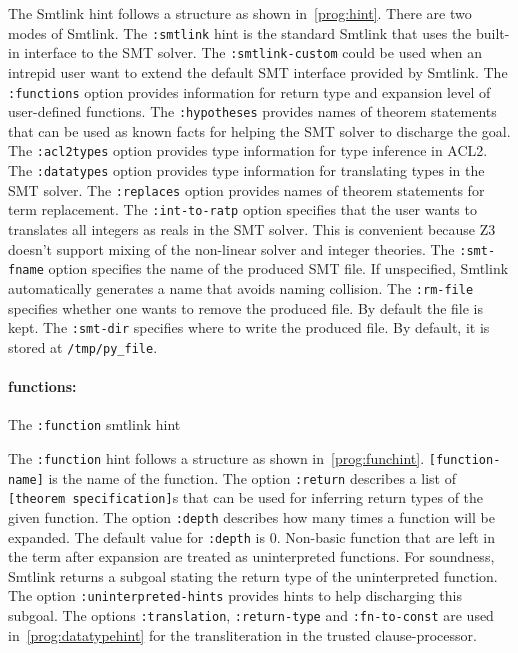 The Smtlink hint follows a structure as shown in~\ref{prog:hint}.
There are two modes of Smtlink. The \texttt{:smtlink} hint is the standard
Smtlink that uses the built-in interface to the SMT solver. The
\texttt{:smtlink-custom} could be used when an intrepid user want to extend the
default SMT interface provided by Smtlink.
The \texttt{:functions} option provides information for return type and
expansion level of user-defined functions.
The \texttt{:hypotheses} provides names of theorem statements that can be used
as known facts for helping the SMT solver to discharge the goal.
The \texttt{:acl2types} option provides type information for type inference in
ACL2.
The \texttt{:datatypes} option provides type information for translating types
in the SMT solver.
The \texttt{:replaces} option provides names of theorem statements for term
replacement.
The \texttt{:int-to-ratp} option specifies that the user wants to translates all
integers as reals in the \acs{SMT} solver. This is convenient because Z3 doesn't
support mixing of the non-linear solver and integer theories. 
The \texttt{:smt-fname} option specifies the name of the produced \acs{SMT}
file. If unspecified, Smtlink automatically generates a name that avoids naming
collision.
The \texttt{:rm-file} specifies whether one wants to remove the produced file.
By default the file is kept.
The \texttt{:smt-dir} specifies where to write the produced file. By default, it
is stored at \texttt{/tmp/py\_file}.

\paragraph{functions: }
\begin{program}[h]
  \caption{The \texttt{:function} smtlink hint}
  \label{prog:funchint}
  
\end{program}

The \texttt{:function} hint follows a structure as shown
in~\ref{prog:funchint}. \texttt{[function-name]} is the name of the function.
The option \texttt{:return} describes a list of \texttt{[theorem
  specification]}s that can be used for inferring return types of the given
function.
The option \texttt{:depth} describes how many times a function will be expanded.
The default value for \texttt{:depth} is $0$. Non-basic function that are left
in the term after expansion are treated as uninterpreted functions. For
soundness, Smtlink returns a subgoal stating the return type of the
uninterpreted function.
The option \texttt{:uninterpreted-hints} provides hints to help discharging this
subgoal.
The options \texttt{:translation}, \texttt{:return-type} and
\texttt{:fn-to-const} are used in~\ref{prog:datatypehint} for the
transliteration in the trusted clause-processor.

